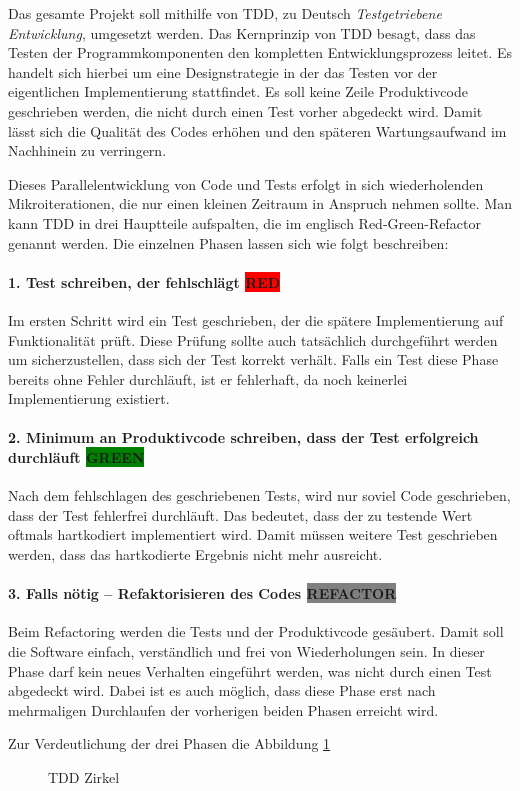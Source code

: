 


Das gesamte Projekt soll mithilfe von \ac{TDD}, zu Deutsch \textit{Testgetriebene Entwicklung}, umgesetzt werden. Das Kernprinzip von \acs{TDD} besagt, dass das Testen der Programmkomponenten den kompletten Entwicklungsprozess leitet.
Es handelt sich hierbei um eine Designstrategie in der das Testen vor der eigentlichen Implementierung stattfindet. Es soll keine Zeile Produktivcode geschrieben werden, die nicht durch einen Test vorher abgedeckt wird.
Damit lässt sich die Qualität des Codes erhöhen und den späteren Wartungsaufwand im Nachhinein zu verringern.

Dieses Parallelentwicklung von Code und Tests erfolgt in sich wiederholenden Mikroiterationen, die nur einen kleinen Zeitraum in Anspruch nehmen sollte. Man kann \acs{TDD} in drei Hauptteile aufspalten, die im englisch Red-Green-Refactor genannt werden. Die einzelnen Phasen lassen sich wie folgt beschreiben:

\paragraph{1. Test schreiben, der fehlschlägt \colorbox{red}{RED}}
Im ersten Schritt wird ein Test geschrieben, der die spätere Implementierung auf Funktionalität prüft. Diese Prüfung sollte auch tatsächlich durchgeführt werden um sicherzustellen, dass sich der Test korrekt verhält. Falls ein Test diese Phase bereits ohne Fehler durchläuft, ist er fehlerhaft, da noch keinerlei Implementierung existiert.

\paragraph{2. Minimum an Produktivcode schreiben, dass der Test erfolgreich durchläuft \colorbox{green}{GREEN}}
Nach dem fehlschlagen des geschriebenen Tests, wird nur soviel Code geschrieben, dass der Test fehlerfrei durchläuft. 
Das bedeutet, dass der zu testende Wert oftmals hartkodiert implementiert wird. Damit müssen weitere Test geschrieben werden, dass das hartkodierte Ergebnis nicht mehr ausreicht.

\paragraph{3. Falls nötig – Refaktorisieren des Codes \colorbox{gray}{REFACTOR}}
Beim Refactoring werden die Tests und der Produktivcode gesäubert. Damit soll die Software einfach, verständlich und frei von Wiederholungen sein. In dieser Phase darf kein neues Verhalten eingeführt werden, was nicht durch einen Test abgedeckt wird. Dabei ist es auch möglich, dass diese Phase erst nach mehrmaligen Durchlaufen der vorherigen beiden Phasen erreicht wird.

Zur Verdeutlichung der drei Phasen die Abbildung \ref{fig:tddcircle}

\begin{figure}[htb]
\centering
{}
\caption{TDD Zirkel}
\label{fig:tddcircle}%
\end{figure}
